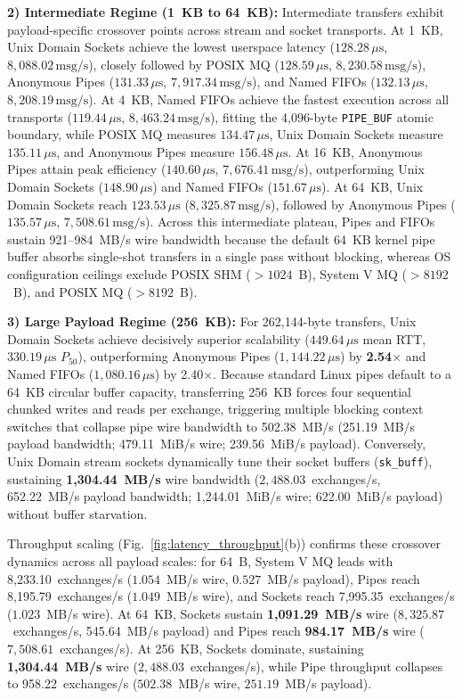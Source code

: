 \textbf{2) Intermediate Regime (1~KB to 64~KB):} Intermediate transfers exhibit payload-specific crossover points across stream and socket transports. At 1~KB, Unix Domain Sockets achieve the lowest userspace latency ($128.28\,\mu\text{s}$, $8,088.02\,\text{msg/s}$), closely followed by POSIX MQ ($128.59\,\mu\text{s}$, $8,230.58\,\text{msg/s}$), Anonymous Pipes ($131.33\,\mu\text{s}$, $7,917.34\,\text{msg/s}$), and Named FIFOs ($132.13\,\mu\text{s}$, $8,208.19\,\text{msg/s}$). At 4~KB, Named FIFOs achieve the fastest execution across all transports ($119.44\,\mu\text{s}$, $8,463.24\,\text{msg/s}$), fitting the 4,096-byte \texttt{PIPE\_BUF} atomic boundary, while POSIX MQ measures $134.47\,\mu\text{s}$, Unix Domain Sockets measure $135.11\,\mu\text{s}$, and Anonymous Pipes measure $156.48\,\mu\text{s}$. At 16~KB, Anonymous Pipes attain peak efficiency ($140.60\,\mu\text{s}$, $7,676.41\,\text{msg/s}$), outperforming Unix Domain Sockets ($148.90\,\mu\text{s}$) and Named FIFOs ($151.67\,\mu\text{s}$). At 64~KB, Unix Domain Sockets reach $123.53\,\mu\text{s}$ ($8,325.87\,\text{msg/s}$), followed by Anonymous Pipes ($135.57\,\mu\text{s}$, $7,508.61\,\text{msg/s}$). Across this intermediate plateau, Pipes and FIFOs sustain 921--984~MB/s wire bandwidth because the default 64~KB kernel pipe buffer absorbs single-shot transfers in a single pass without blocking, whereas OS configuration ceilings exclude POSIX SHM ($>1024$~B), System V MQ ($>8192$~B), and POSIX MQ ($>8192$~B).

\textbf{3) Large Payload Regime (256~KB):} For 262,144-byte transfers, Unix Domain Sockets achieve decisively superior scalability ($449.64\,\mu\text{s}$ mean RTT, $330.19\,\mu\text{s}$ $P_{50}$), outperforming Anonymous Pipes ($1,144.22\,\mu\text{s}$) by \textbf{2.54$\times$} and Named FIFOs ($1,080.16\,\mu\text{s}$) by 2.40$\times$. Because standard Linux pipes default to a 64~KB circular buffer capacity, transferring 256~KB forces four sequential chunked writes and reads per exchange, triggering multiple blocking context switches that collapse pipe wire bandwidth to 502.38~MB/s (251.19~MB/s payload bandwidth; 479.11~MiB/s wire; 239.56~MiB/s payload). Conversely, Unix Domain stream sockets dynamically tune their socket buffers (\texttt{sk\_buff}), sustaining \textbf{1,304.44~MB/s} wire bandwidth ($2,488.03$~exchanges/s, 652.22~MB/s payload bandwidth; 1,244.01~MiB/s wire; 622.00~MiB/s payload) without buffer starvation.

Throughput scaling (Fig.~\ref{fig:latency_throughput}(b)) confirms these crossover dynamics across all payload scales: for 64~B, System V MQ leads with 8,233.10~exchanges/s ($1.054$~MB/s wire, $0.527$~MB/s payload), Pipes reach 8,195.79~exchanges/s ($1.049$~MB/s wire), and Sockets reach 7,995.35~exchanges/s ($1.023$~MB/s wire). At 64~KB, Sockets sustain \textbf{1,091.29~MB/s} wire ($8,325.87$~exchanges/s, 545.64~MB/s payload) and Pipes reach \textbf{984.17~MB/s} wire ($7,508.61$~exchanges/s). At 256~KB, Sockets dominate, sustaining \textbf{1,304.44~MB/s} wire ($2,488.03$~exchanges/s), while Pipe throughput collapses to 958.22~exchanges/s ($502.38$~MB/s wire, $251.19$~MB/s payload).

